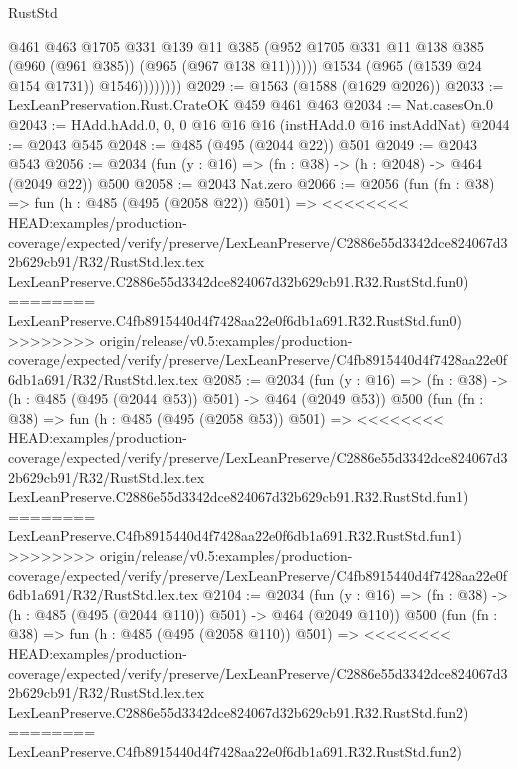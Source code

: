 \begin{lexlean}{RustStd}
\begin{coremodule}
{\begin{coremodule}
{{{{{{{                          @461
                          @463
                          @1705
                          @331
                          @139
                          @11
                          @385
                          (@952
                            @1705
                            @331
                            @11
                            @138
                            @385
                            (@960 (@961 @385))
                            (@965 (@967 @138 @11))))))
                    @1534
                    (@965 (@1539 @24 @154 @1731))
                    @1546))))))))
@2029 := @1563 (@1588 (@1629 @2026))
@2033 := LexLeanPreservation.Rust.CrateOK @459 @461 @463
@2034 := Nat.casesOn.{0}
@2043 := HAdd.hAdd.{0, 0, 0} @16 @16 @16 (instHAdd.{0} @16 instAddNat)
@2044 := @2043 @545
@2048 := @485 (@495 (@2044 @22)) @501
@2049 := @2043 @543
@2056 := @2034 (fun (y : @16) => (fn : @38) -> (h : @2048) -> @464 (@2049 @22)) @500
@2058 := @2043 Nat.zero
@2066 := @2056
    (fun (fn : @38) =>
    fun (h : @485 (@495 (@2058 @22)) @501) =>
<<<<<<<< HEAD:examples/production-coverage/expected/verify/preserve/LexLeanPreserve/C2886e55d3342dce824067d32b629cb91/R32/RustStd.lex.tex
    LexLeanPreserve.C2886e55d3342dce824067d32b629cb91.R32.RustStd.fun0)
========
    LexLeanPreserve.C4fb8915440d4f7428aa22e0f6db1a691.R32.RustStd.fun0)
>>>>>>>> origin/release/v0.5:examples/production-coverage/expected/verify/preserve/LexLeanPreserve/C4fb8915440d4f7428aa22e0f6db1a691/R32/RustStd.lex.tex
@2085 := @2034
    (fun (y : @16) => (fn : @38) -> (h : @485 (@495 (@2044 @53)) @501) -> @464 (@2049 @53))
    @500
    (fun (fn : @38) =>
    fun (h : @485 (@495 (@2058 @53)) @501) =>
<<<<<<<< HEAD:examples/production-coverage/expected/verify/preserve/LexLeanPreserve/C2886e55d3342dce824067d32b629cb91/R32/RustStd.lex.tex
    LexLeanPreserve.C2886e55d3342dce824067d32b629cb91.R32.RustStd.fun1)
========
    LexLeanPreserve.C4fb8915440d4f7428aa22e0f6db1a691.R32.RustStd.fun1)
>>>>>>>> origin/release/v0.5:examples/production-coverage/expected/verify/preserve/LexLeanPreserve/C4fb8915440d4f7428aa22e0f6db1a691/R32/RustStd.lex.tex
@2104 := @2034
    (fun (y : @16) => (fn : @38) -> (h : @485 (@495 (@2044 @110)) @501) -> @464 (@2049 @110))
    @500
    (fun (fn : @38) =>
    fun (h : @485 (@495 (@2058 @110)) @501) =>
<<<<<<<< HEAD:examples/production-coverage/expected/verify/preserve/LexLeanPreserve/C2886e55d3342dce824067d32b629cb91/R32/RustStd.lex.tex
    LexLeanPreserve.C2886e55d3342dce824067d32b629cb91.R32.RustStd.fun2)
========
    LexLeanPreserve.C4fb8915440d4f7428aa22e0f6db1a691.R32.RustStd.fun2)
}}}}}}}
\end{coremodule}}
\end{coremodule}
\end{lexlean}
